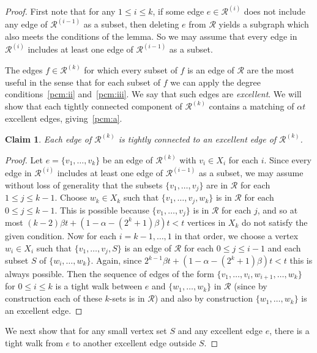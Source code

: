 \documentclass[12pt,a4paper]{amsart}
\newtheorem{claim}[theorem] {Claim}
\newcommand{\oldqed}{}
\def\endofClaim{\hfill\scalebox{.6}{$\Box$}}
\newenvironment{claimproof}[1][Proof]{
  \renewcommand{\oldqed}{\qedsymbol}
  \renewcommand{\qedsymbol}{\endofClaim}
  \begin{proof}[#1]
}{
  \end{proof}
  \renewcommand{\qedsymbol}{\oldqed}
}
\newcommand{\cR}{\mathcal{R}}
\begin{document}
\begin{proof}
First note that for any $1 \leq i \leq k$, if some edge $e \in \cR^{(i)}$ does not include any edge of $\cR^{(i-1)}$ as a subset, then deleting $e$ from $\cR$ yields a subgraph which also meets the conditions of the lemma. So we may assume that every edge in $\cR^{(i)}$ includes at least one edge of $\cR^{(i-1)}$ as a subset.

The edges $f \in \cR^{(k)}$ for which every subset of $f$ is an edge of $\cR$ are the most useful in the sense that for each subset of $f$ we can apply the degree conditions~\ref{pcm:ii} and~\ref{pcm:iii}. We say that such edges are \emph{excellent}. We will show that each tightly connected component of $\cR^{(k)}$ contains a matching of $\alpha t$ excellent edges, giving~\ref{pcm:a}.
\begin{claim}\label{clm:pcm:conn}
 Each edge of $\cR^{(k)}$ is tightly connected to an excellent edge of $\cR^{(k)}$.
\end{claim}
\begin{claimproof}
Let $e=\{v_1,\ldots,v_k\}$ be an edge of $\cR^{(k)}$ with $v_i\in X_i$ for each $i$. Since every edge in $\cR^{(i)}$ includes at least one edge of $\cR^{(i-1)}$ as a subset, we may
assume without loss of generality that the
subsets $\{v_1,\ldots,v_j\}$ are in $\cR$ for each $1\le j \le k-1$. Choose $w_k \in X_k$ such that $\{v_1,\ldots,v_j,w_k\}$ is in $\cR$ for each
$0\le j\le k-1$. This is possible because $\{v_1,\ldots,v_j\}$ is in $\cR$ for each
$j$, and so at most $(k-2)\beta t+(1-\alpha-(2^k+1)\beta)t<t$ vertices in $X_k$
do not satisfy the given condition.
Now for each $i=k-1,\ldots,1$ in
that order, we choose a vertex $w_i \in X_i$ such that $\{v_1,\ldots,v_j,S\}$ is an edge of $\cR$ for each $0\le j\le i-1$ and each subset $S$ of $\{w_i,\ldots,w_k\}$.
Again, since $2^{k-1}\beta t+(1-\alpha-(2^k+1)\beta)t<t$ this is always possible.
Then the sequence of edges of the form $\{v_1,\ldots,v_i,w_{i+1},\ldots,w_k\}$ for $0\le i\le
k$ is a tight walk between $e$ and $\{w_1,\ldots,w_k\}$ in $\cR$ (since by
construction each of these $k$-sets is in $\cR$) and also by
construction $\{w_1,\ldots,w_k\}$ is an excellent edge.
\end{claimproof}

 We next show that for any small vertex set $S$ and any excellent edge $e$, there is a tight walk from $e$ to another excellent edge outside $S$.


\end{proof}
\end{document}
